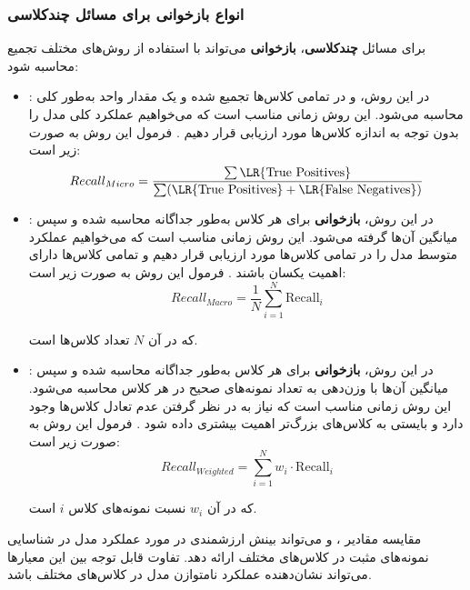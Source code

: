 \subsubsection{انواع بازخوانی برای مسائل چندکلاسی}


برای مسائل \textbf{چندکلاسی}، \textbf{بازخوانی} می‌تواند با استفاده از روش‌های مختلف تجمیع محاسبه شود:

\begin{itemize}
	\item \textbf{}: در این روش، \textbf{} و \textbf{} در تمامی کلاس‌ها تجمیع شده و یک مقدار واحد به‌طور کلی محاسبه می‌شود. این روش زمانی مناسب است که می‌خواهیم عملکرد کلی مدل را بدون توجه به اندازه کلاس‌ها مورد ارزیابی قرار دهیم \cite{ref_sokolova2009}. فرمول این روش به صورت زیر است:
	\begin{equation}
		Recall_{Micro} = \frac{\sum \text{\LR{True Positives}}}{\sum (\text{\LR{True Positives}} + \text{\LR{False Negatives}})}
	\end{equation}
	
	\item \textbf{}: در این روش، \textbf{بازخوانی} برای هر کلاس به‌طور جداگانه محاسبه شده و سپس میانگین آن‌ها گرفته می‌شود. این روش زمانی مناسب است که می‌خواهیم عملکرد متوسط مدل را در تمامی کلاس‌ها مورد ارزیابی قرار دهیم و تمامی کلاس‌ها دارای اهمیت یکسان باشند \cite{ref_sokolova2009}. فرمول این روش به صورت زیر است:
	\begin{equation}
		Recall_{Macro} = \frac{1}{N} \sum_{i=1}^{N} \text{Recall}_i
	\end{equation}
	
	که در آن \( N \) تعداد کلاس‌ها است.
	
	\item \textbf{}: در این روش، \textbf{بازخوانی} برای هر کلاس به‌طور جداگانه محاسبه شده و سپس میانگین آن‌ها با وزن‌دهی به تعداد نمونه‌های صحیح در هر کلاس محاسبه می‌شود. این روش زمانی مناسب است که نیاز به در نظر گرفتن عدم تعادل کلاس‌ها وجود دارد و بایستی به کلاس‌های بزرگ‌تر اهمیت بیشتری داده شود \cite{ref_sokolova2009}. فرمول این روش به صورت زیر است:
	\begin{equation}
		Recall_{Weighted} = \sum_{i=1}^{N} w_i \cdot \text{Recall}_i
	\end{equation}
	
	که در آن \( w_i \) نسبت نمونه‌های کلاس \( i \) است.
	
\end{itemize}

مقایسه مقادیر ،  و  می‌تواند بینش ارزشمندی در مورد عملکرد مدل در شناسایی نمونه‌های مثبت در کلاس‌های مختلف ارائه دهد. تفاوت قابل توجه بین این معیارها می‌تواند نشان‌دهنده عملکرد نامتوازن مدل در کلاس‌های مختلف باشد.

